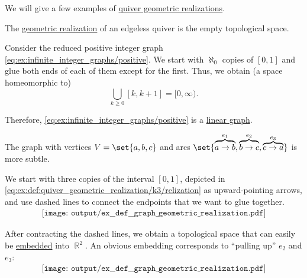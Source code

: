 \begin{example}\label{ex:def:quiver_geometric_realization}
  We will give a few examples of \hyperref[def:quiver_geometric_realization/undirected]{quiver geometric realizations}.

  \begin{thmenum}
     The \hyperref[def:quiver_geometric_realization/undirected]{geometric realization} of an edgeless quiver is the empty topological space.

     Consider the reduced positive integer graph \eqref{eq:ex:infinite_integer_graphs/positive}. We start with \( \aleph_0 \) copies of \( [0, 1] \) and glue both ends of each of them except for the first. Thus, we obtain (a space homeomorphic to)
    \begin{equation*}
      \bigcup_{k \geq 0} [k, k + 1] = [0, \infty).
    \end{equation*}

    Therefore, \eqref{eq:ex:infinite_integer_graphs/positive} is a \hyperref[def:quiver_geometric_realization/linear]{linear graph}.

     The graph with vertices \( V = \set{ a, b, c } \) and arcs \( \set{ \overbrace{a \to b}^{e_1}, \overbrace{b \to c}^{e_2}, \overbrace{c \to a}^{e_3} } \) is more subtle.

    We start with three copies of the interval \( [0, 1] \), depicted in \eqref{eq:ex:def:quiver_geometric_realization/k3/relization} as upward-pointing arrows, and use dashed lines to connect the endpoints that we want to glue together.
    \begin{equation}\label{eq:ex:def:quiver_geometric_realization/k3/relization}
      \begin{aligned}
        \texttt{[image: output/ex\_\_def\_\_graph\_geometric\_realization.pdf]}
      \end{aligned}
    \end{equation}

    After contracting the dashed lines, we obtain a topological space that can easily be \hyperref[def:quiver_geometric_realization/embedding]{embedded} into \( \BbbR^2 \). An obvious embedding corresponds to \enquote{pulling up} \( e_2 \) and \( e_3 \):
    \begin{equation}\label{eq:ex:def:quiver_geometric_realization/k3/embedding}
      \begin{aligned}
        \texttt{[image: output/ex\_\_def\_\_graph\_geometric\_realization.pdf]}
      \end{aligned}
    \end{equation}


\end{thmenum}
\end{example}

